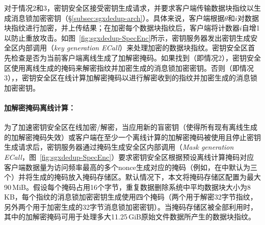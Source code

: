 对于情况2和3，密钥安全区接受密钥生成请求，并要求客户端传输数据块指纹以生成消息锁加密密钥（\S\ref{subsec:sgxdedup-arch}）。具体来说，客户端根据$\theta$和$i$对数据块指纹进行加密，并上​​传结果；在加密每个数据块指纹后，客户端将计数器$i$自增1以防止重放攻击。如图~\ref{fig:sgxdedup-SpecEnc}所示，密钥服务器发出密钥生成安全区内部调用（\textit{key generation ECall}）来处理加密的数据块指纹。密钥安全区首先检查是否为当前客户端离线生成了加解密掩码。如果找到（即情况2），密钥安全区使用离线生成的掩码来解密指纹并加密生成的消息锁加密密钥。否则（即情况3），，密钥安全区在线计算加解密掩码以进行解密收到的指纹并加密生成的消息锁加密密钥。

\paragraph*{加解密掩码离线计算：}为了加速密钥安全区在线加密/解密，当应用新的盲密钥（使得所有现有离线生成的加解密掩码失效）或客户端在至少一个离线计算的加解密掩码被使用且停止密钥生成请求后，密钥服务器通过掩码生成安全区内部调用（\textit{Mask generation ECall}，图~\ref{fig:sgxdedup-SpecEnc}）要求密钥安全区根据预设离线计算掩码对应客户端数据量为访问频率最高的多个nonce生成对应的掩码（例如，在\sysnameS 中默认为三个）并将生成的掩码放入掩码存储区。默认情况下，本文将掩码存储区配置为最大 90\,MiB。假设每个掩码占用16个字节，重复数据删除系统中平均数据块大小为8\,KB，每个指纹的消息锁加密密钥生成使用四个掩码（两个用于解密32字节指纹，另外两个用于加密生成的32字节消息锁加密密钥）。当掩码存储区被全部利用时，其中的加解密掩码可用于处理多大11.25\,GiB原始文件数据所产生的数据块指纹。
